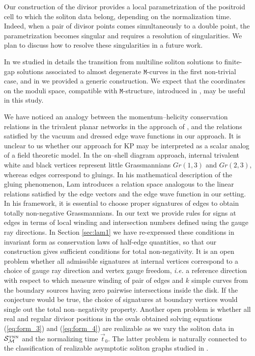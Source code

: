 \documentclass[11pt]{amsart}
\theoremstyle{plain}
\numberwithin{equation}{section}
\def \S {{\mathcal S}_{\mathcal M}^{\mbox{\tiny TNN}}}
\begin{document}
Our construction of the divisor provides a local parametrization of the positroid cell to which the soliton data belong, depending on the normalization time. Indeed, when a pair of divisor points comes simultaneously to a double point, the parametrization becomes singular and requires a resolution of singularities. We plan to discuss how to resolve these singularities in a future work.  

In \cite{AG2} we studied in details the transition from multiline soliton solutions to finite-gap solutions associated to almost degenerate $\mathtt M$-curves in the first non-trivial case, and in \cite{AG3} we provided a generic construction. We expect that the coordinates on the moduli space, compatible with $\mathtt M$-structure, introduced in \cite{Kr5}, may be useful in this study. 

We have noticed an analogy between the momentum--helicity conservation relations in the trivalent planar networks in the approach of \cite{AGP1,AGP2}, and the relations satisfied by the vacuum and dressed edge wave functions in our approach. It is unclear to us whether our approach for KP may be interpreted as a scalar analog of a field theoretic model. In the 
on--shell diagram approach, internal trivalent white and black vertices represent little Grassmannians $Gr(1,3)$ and $Gr(2,3)$, whereas edges correspond to gluings. 
In his mathematical description of the gluing phenomenon,
Lam \cite{Lam2} introduces a relation space analogous to the linear relations satisfied by the edge vectors and the edge wave function in our setting. In his framework, it is essential to choose proper signatures of edges to obtain totally non-negative Grassmannians. In our text we provide rules for signs at edges in terms of local winding and intersection numbers defined using the gauge ray directions. In Section \ref{sec:lam1} we have re-expressed these conditions in invariant form as conservation laws of half-edge quantities, so that our construction gives sufficient conditions for total non-negativity.
It is an open problem whether all admissible signatures at internal vertices 
correspond to a choice of gauge ray direction and vertex gauge freedom, {\sl i.e.} a reference direction with respect to which measure winding of pair of edges and $k$ simple curves from the boundary sources having zero pairwise intersections inside the disk. If the conjecture would be true, the choice of signatures at boundary vertices would single out the total non--negativity property. Another open problem is whether all real and regular divisor positions in the ovals obtained solving equations (\ref{eq:form_3}) and (\ref{eq:form_4}) are realizable as we vary the soliton data in $\S$ and the normalizing time $\vec t_0$. The latter problem is naturally connected to the classification of realizable asymptotic soliton graphs studied in \cite{KW2}.
\end{document}
